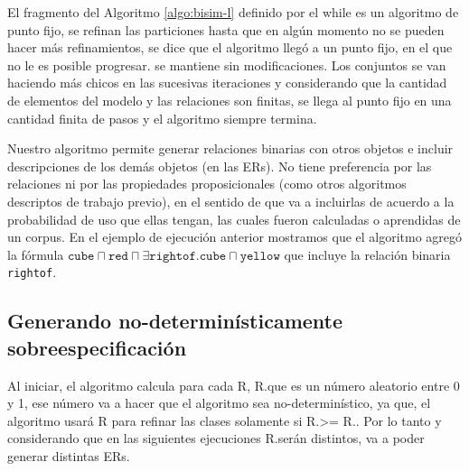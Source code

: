 El fragmento del Algoritmo \ref{algo:bisim-l} definido por el while es un algoritmo de punto fijo, se refinan las particiones hasta que en alg\'un momento no se pueden hacer m\'as refinamientos, se dice que el algoritmo lleg\'o a un punto fijo, en el que no le es posible progresar. \RE se mantiene sin modificaciones. Los conjuntos se van haciendo m\'as chicos en las sucesivas iteraciones y considerando que la cantidad de elementos del modelo y las relaciones son finitas, se llega al punto fijo en una cantidad finita de pasos y el algoritmo siempre termina.

Nuestro algoritmo permite generar relaciones binarias con otros objetos e incluir descripciones de los dem\'as objetos (en las ERs). No tiene preferencia por las relaciones ni por las propiedades proposicionales (como otros algoritmos descriptos de trabajo previo), en el sentido de que va a incluirlas de acuerdo a la probabilidad de uso que ellas tengan, las cuales fueron calculadas o aprendidas de un corpus. En el ejemplo de ejecuci\'on anterior mostramos que el algoritmo agreg\'o la f\'ormula $\texttt{cube} \sqcap \texttt{red} \sqcap \exists \texttt{rightof}. \texttt{cube} \sqcap \texttt{yellow}$ que incluye la relaci\'on binaria \texttt{rightof}.

\subsection{Generando no-determin\'isticamente sobreespecificaci\'on}
\label{sec:overspecification}



Al iniciar, el algoritmo calcula para cada R, R.\randomuse que es un n\'umero aleatorio entre 0 y 1, ese n\'umero va a hacer que el algoritmo sea no-determin\'istico, ya que, el algoritmo usar\'a R para refinar las clases solamente si 
R.\randomuse >= R.\puse. Por lo tanto y considerando que en las siguientes ejecuciones R.\randomuse ser\'an distintos, va a poder generar distintas ERs.

